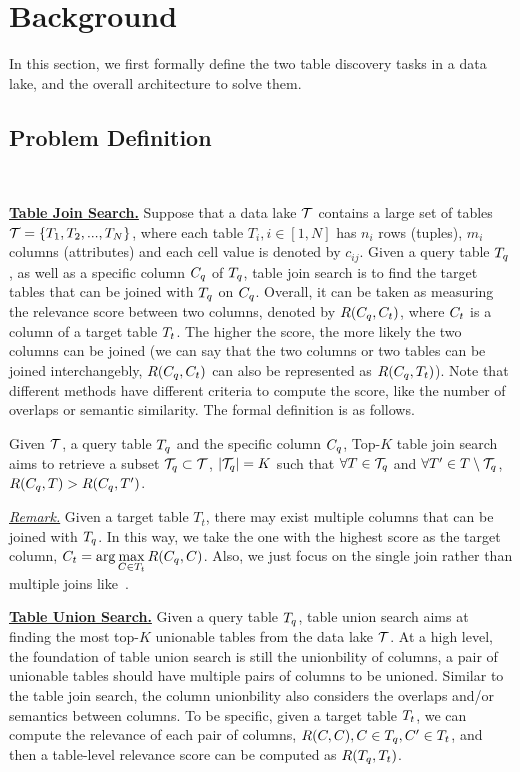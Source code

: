 \section{Background} 
In this section, we first formally define the two table discovery tasks in a data lake, and the overall architecture to solve them.

\subsection{Problem Definition}~\label{subsec:def}


\noindent\textbf{\underline{Table Join Search.}}
Suppose that a data lake $\mathcal{T}$ contains a large set of tables $\mathcal{T}=\{T_1, T_2, ..., T_N\}$, where each table $T_i, i \in [1,N]$ has $n_i$ rows (tuples), $m_i$ columns (attributes) and each cell value is denoted by $c_{ij}$.  Given a query table $T_q$, as well as a specific column $C_q$ of $T_q$, table join search is to find the target tables that can be joined with  $T_q$ on $C_q$.
%
Overall, it can be taken as measuring the relevance score between two columns, denoted by $R(C_q, C_t)$, where   $C_t$ is a column  of a target table $T_t$. The higher the score, the more likely the two columns can be joined (we can say that the two columns or two tables can be joined interchangebly, \ie $R(C_q, C_t)$  can also be represented as $R(C_q, T_t)$).
Note that different methods have different criteria to compute the score, like the number of overlaps or semantic similarity.
 The formal definition is as follows. 

\begin{definition}
	Given $\mathcal{T}$, a query table $T_q$ and the specific column $C_q$, Top-$K$ table join search aims to retrieve a subset $\mathcal{T}_q \subset \mathcal{T}$, $|\mathcal{T}_q|=K$ such that $\forall T \in \mathcal{T}_q$ and $\forall T' \in T \setminus \mathcal{T}_q$, $R(C_q, T)>R(C_q, T')$.
\end{definition}

\noindent \underline{\textit{Remark.}} Given a target table $T_t$, there may exist multiple columns that can be joined with $T_q$. In this way,  we  take the one with the highest score as the target column, \ie $C_t=\arg\max\limits_{C\in T_t} R(C_q, C)$. Also, we just focus on the single join rather than multiple joins like~\cite{}.

\noindent\textbf{\underline{Table Union Search.}} Given a query table $T_q$,  table union search aims at finding the most top-$K$ unionable tables from the data lake $\mathcal{T}$. At a high level, the foundation of table union search is still the unionbility of  columns, \ie a pair of unionable tables should have multiple pairs of columns to be unioned. Similar to the table join search, the column unionbility also considers the overlaps and/or semantics between columns. To be specific, given a target table $T_t$, we can compute the relevance of each pair of columns, \ie   $R(C, C), C \in T_q, C' \in T_t$, and then a table-level relevance score can be computed as $R(T_q, T_t)$.


